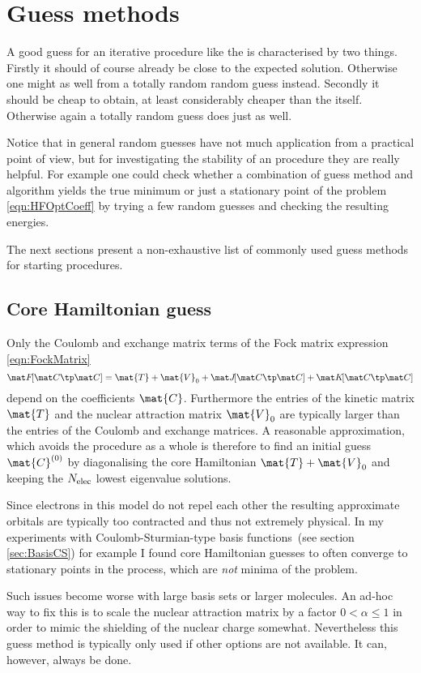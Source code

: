 \section{Guess methods}
A good guess for an iterative procedure like the \SCF
is characterised by two things.
Firstly it should of course already be close to the expected solution.
Otherwise one might as well from a totally random random guess instead.
Secondly it should be cheap to obtain,
at least considerably cheaper than the \SCF itself.
Otherwise again a totally random guess does just as well.

Notice that in general random guesses have not much application
from a practical point of view,
but for investigating the stability of an \SCF procedure
they are really helpful.
For example one could check whether a combination of guess method
and \SCF algorithm yields the true minimum or just a stationary
point of the \HF problem \eqref{eqn:HFOptCoeff}
by trying a few random guesses and checking the resulting energies.

The next sections present a non-exhaustive list of
commonly used guess methods for starting \SCF procedures.

\subsection{Core Hamiltonian guess}
Only the Coulomb and exchange matrix terms of the Fock matrix
expression \eqref{eqn:FockMatrix}
\[ \matFfull = \mat{T} + \mat{V}_0 + \matJfull + \matKfull \]
depend on the coefficients $\mat{C}$.
Furthermore the entries of the kinetic matrix $\mat{T}$
and the nuclear attraction matrix $\mat{V}_0$
are typically larger than the entries of the Coulomb and exchange matrices.
A reasonable approximation,
which avoids the \SCF procedure as a whole
is therefore to find an initial guess $\mat{C}^{(0)}$
by diagonalising the core Hamiltonian $\mat{T} + \mat{V}_0$
and keeping the $N_\text{elec}$ lowest eigenvalue solutions.

Since electrons in this model do not repel each other
the resulting approximate orbitals are typically too contracted
and thus not extremely physical.
In my experiments with Coulomb-Sturmian-type
basis functions~(see section \ref{sec:BasisCS})
for example I found core Hamiltonian guesses to often
converge to stationary points in the \SCF process,
which are \emph{not} minima of the \HF problem.

Such issues become worse with large basis sets or larger molecules.
An ad-hoc way to fix this is to scale the nuclear attraction
matrix by a factor $0 < \alpha \leq 1$
in order to mimic the shielding of the nuclear charge somewhat.
Nevertheless this guess method is typically only used
if other options are not available.
It can, however, always be done.

